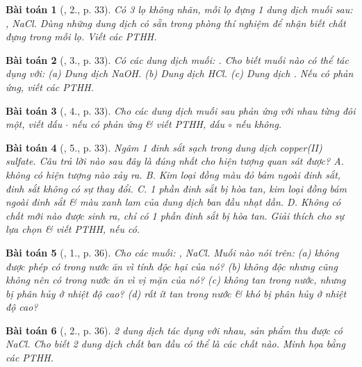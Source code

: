 \documentclass{article}
\newtheorem{baitoan}{Bài toán}
\begin{document}
\begin{baitoan}[\cite{SGK_Hoa_Hoc_9}, 2., p. 33]
	Có 3 lọ không nhãn, mỗi lọ đựng 1 dung dịch muối sau: \emph{, NaCl}. Dùng những dung dịch có sẵn trong phòng thí nghiệm để nhận biết chất đựng trong mỗi lọ. Viết các PTHH.
\end{baitoan}

\begin{baitoan}[\cite{SGK_Hoa_Hoc_9}, 3., p. 33]
	Có các dung dịch muối: \emph{}. Cho biết muối nào có thể tác dụng với: (a) Dung dịch \emph{NaOH}. (b) Dung dịch \emph{HCl}. (c) Dung dịch \emph{}. Nếu có phản ứng, viết các PTHH.
\end{baitoan}

\begin{baitoan}[\cite{SGK_Hoa_Hoc_9}, 4., p. 33]
	Cho các dung dịch muối sau phản ứng với nhau từng đôi một, viết dấu $\cdot$ nếu có phản ứng \& viết PTHH, dấu $\circ$ nếu không.
\end{baitoan}

\begin{baitoan}[\cite{SGK_Hoa_Hoc_9}, 5., p. 33]
	Ngâm 1 đinh sắt sạch trong dung dịch copper(II) sulfate. Câu trả lời nào sau đây là đúng nhất cho hiện tượng quan sát được? {\sf A.} không có hiện tượng nào xảy ra. {\sf B.} Kim loại đồng màu đỏ bám ngoài đinh sắt, đinh sắt không có sự thay đổi. {\sf C.} 1 phần đinh sắt bị hòa tan, kim loại đồng bám ngoài đinh sắt \& màu xanh lam của dung dịch ban đầu nhạt dần. {\sf D.} Không có chất mới nào được sinh ra, chỉ có 1 phần đinh sắt bị hòa tan. Giải thích cho sự lựa chọn \& viết PTHH, nếu có.
\end{baitoan}

\begin{baitoan}[\cite{SGK_Hoa_Hoc_9}, 1., p. 36]
	Cho các muối: \emph{, NaCl}. Muối nào nói trên: (a) không được phép có trong nước ăn vì tính độc hại của nó? (b) không độc nhưng cũng không nên có trong nước ăn vì vị mặn của nó? (c) không tan trong nước, nhưng bị phân hủy ở nhiệt độ cao? (d) rất ít tan trong nước \& khó bị phân hủy ở nhiệt độ cao?
\end{baitoan}

\begin{baitoan}[\cite{SGK_Hoa_Hoc_9}, 2., p. 36]
	2 dung dịch tác dụng với nhau, sản phẩm thu được có \emph{NaCl}. Cho biết 2 dung dịch chất ban đầu có thể là các chất nào. Minh họa bằng các PTHH.
\end{baitoan}
\end{document}
